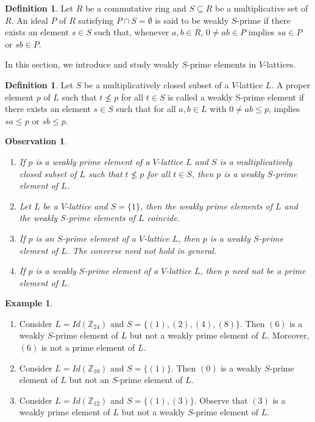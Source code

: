 \documentclass[10pt,twoside,a4paper]{amsart}
\numberwithin{equation}{section}
\theoremstyle{plain}
\newtheorem{obs}[lem]{Observation}
\theoremstyle{definition}
\newtheorem{exa}[lem]{Example}
\newtheorem{defn}[lem]{Definition}
\newtheorem{definition}[lem]{Definition}
\begin{document}
\begin{defn} 
	Let $R$ be a commutative ring and $S\subseteq R$ be a multiplicative set of $R$. An ideal $P$ of $R$ satisfying $P \cap S =\emptyset$ is said to be weakly $S$-prime if there exists an element $s\in S$ such that, whenever $a, b\in R$, $0\neq ab\in P$ implies $sa\in P$ or $sb\in P$.
\end{defn}

In this section, we introduce and study weakly $S$-prime elements in $V$-lattices.

\begin{definition}
	Let $S$ be a multiplicatively closed subset of a $V$-lattice $L$. A proper element $p$ of $L$ such that $t\nleq p$ for all $t\in S$ is called a weakly S-prime element if there exists an element $s\in S$ such that for all $a,b\in L$ with $0\neq ab\leq p$, implies $sa\leq p$ or $sb\leq  p$.	
\end{definition}

\begin{obs}
	\begin{enumerate}
		\item  If $p$ is a weakly prime element of a $V$-lattice $L$ and $S$ is a multiplicatively closed subset of $L$ such that $t\nleq p$ for all $t\in S$, then $p$ is a weakly $S$-prime element of $L$.
		
		\item Let $L$ be a $V$-lattice and $S=\{1\}$, then the weakly prime elements of $L$ and the weakly $S$-prime elements of $L$ coincide.
		
		\item  If $p$ is an $S$-prime element of a $V$-lattice $L$, then $p$ is a weakly $S$-prime element of $L$. The converse need not  hold in general. 
		
		\item If $p$ is a weakly $S$-prime element of a $V$-lattice $L$, then $p$ need not be a prime element of $L$.
		
	\end{enumerate}
\end{obs}

\begin{exa}
	\begin{enumerate}
		\item  Consider $L=Id(\mathbb{Z}_{24})$ and $S=\{(1), (2),(4),(8)\}$. Then $(6)$ is a weakly $S$-prime element of $L$ but not a weakly prime element of $L$. Moreover, $(6)$ is not a prime element of $L$. 
		
		\item Consider $L=Id(\mathbb{Z}_{10})$ and $S=\{(1)\}$. Then $(0)$ is a weakly $S$-prime element of $L$ but not an $S$-prime element of $L$.
		
		\item Consider $L=Id(\mathbb{Z}_{12})$ and $S=\{(1),(3)\}$. Observe that $(3)$ is a weakly prime element of $L$ but not a weakly $S$-prime element of $L$.
		
	\end{enumerate}
\end{exa}
\end{document}
